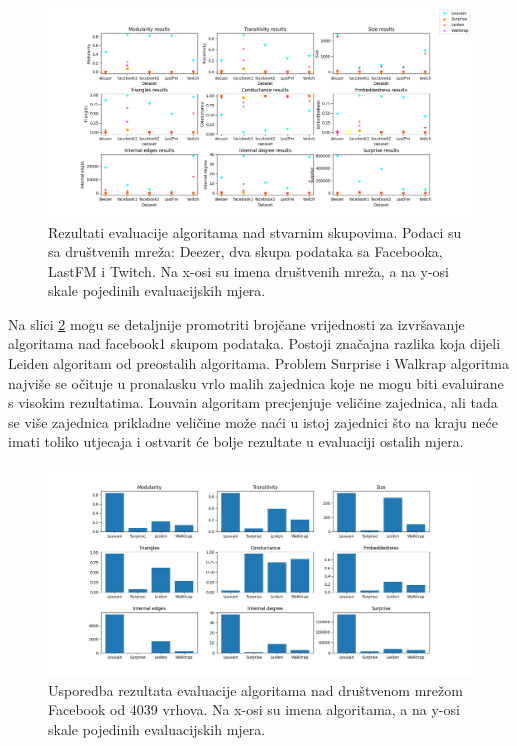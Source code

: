 \begin{figure}
	\includegraphics[width=\linewidth]{images/test3.png}
	\caption{Rezultati evaluacije algoritama nad stvarnim skupovima. Podaci su sa društvenih mreža: Deezer, dva skupa podataka sa Facebooka, LastFM i Twitch. Na x-osi su imena društvenih mreža, a na y-osi skale pojedinih evaluacijskih mjera.}
	\label{fig:test3}
\end{figure}


Na slici \ref{fig:facebook_res} mogu se detaljnije promotriti brojčane vrijednosti za izvršavanje algoritama nad facebook1 skupom podataka. Postoji značajna razlika koja dijeli Leiden algoritam od preostalih algoritama. Problem Surprise i Walkrap algoritma najviše se očituje u pronalasku vrlo malih zajednica koje ne mogu biti evaluirane s visokim rezultatima. Louvain algoritam precjenjuje veličine zajednica, ali tada se više zajednica prikladne veličine može naći u istoj zajednici što na kraju neće imati toliko utjecaja i ostvarit će bolje rezultate u evaluaciji ostalih mjera.



\begin{figure}
	\includegraphics[width=\linewidth]{images/facebook1.png}
	\caption{Usporedba rezultata evaluacije algoritama nad društvenom mrežom Facebook od 4039 vrhova. Na x-osi su imena algoritama, a na y-osi skale pojedinih evaluacijskih mjera.}
	\label{fig:facebook_res}
\end{figure}


